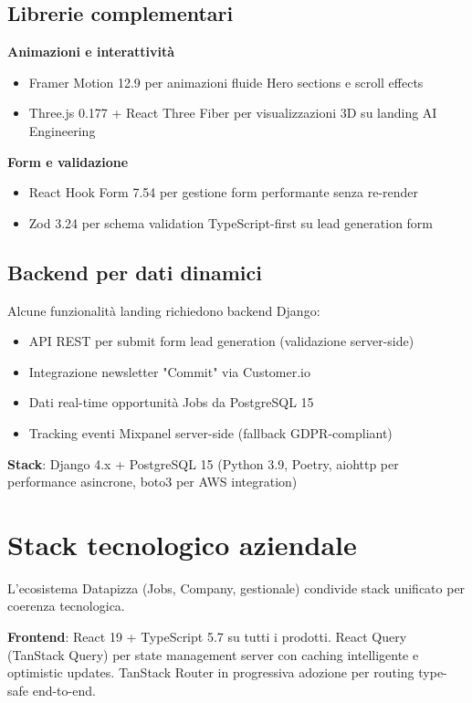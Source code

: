\subsection{Librerie complementari}

\textbf{Animazioni e interattività}
\begin{itemize}
  \item Framer Motion 12.9 per animazioni fluide Hero sections e scroll effects
  \item Three.js 0.177 + React Three Fiber per visualizzazioni 3D su landing AI Engineering
\end{itemize}

\textbf{Form e validazione}
\begin{itemize}
  \item React Hook Form 7.54 per gestione form performante senza re-render
  \item Zod 3.24 per schema validation TypeScript-first su lead generation form
\end{itemize}

\subsection{Backend per dati dinamici}

Alcune funzionalità landing richiedono backend Django:
\begin{itemize}
  \item API REST per submit form lead generation (validazione server-side)
  \item Integrazione newsletter "Commit" via Customer.io
  \item Dati real-time opportunità Jobs da PostgreSQL 15
  \item Tracking eventi Mixpanel server-side (fallback GDPR-compliant)
\end{itemize}

\textbf{Stack}: Django 4.x + PostgreSQL 15 (Python 3.9, Poetry, aiohttp per performance asincrone, boto3 per AWS integration)

\section{Stack tecnologico aziendale}
L'ecosistema Datapizza (Jobs, Company, gestionale) condivide stack unificato per coerenza tecnologica.

\textbf{Frontend}: React 19 + TypeScript 5.7 su tutti i prodotti. React Query (TanStack Query) per state management server con caching intelligente e optimistic updates. TanStack Router in progressiva adozione per routing type-safe end-to-end.

